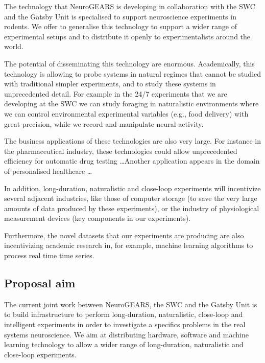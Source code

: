 The technology that NeuroGEARS is developing in collaboration with the SWC and
the Gatsby Unit is specialised to support neuroscience experiments in rodents.
We offer to generalise this technology to support a wider range of experimental
setups and to distribute it openly to experimentalists around the world.

The potential of disseminating this technology are enormous. Academically,
this technology is allowing to probe systems in natural regimes that cannot
be studied with traditional simpler experiments, and to study these systems in
unprecedented detail. For example in the 24/7 experiments that we
are developing at the SWC we can study foraging in naturalistic environments
where we can control environmental experimental variables (e.g., food delivery)
with great precision, while we record and manipulate neural activity.

The business applications of these technologies are also very large. For
instance in the pharmaceutical industry, these technologies could allow
unprecedented efficiency for automatic drug testing \ldots Another application
appears in the domain of personalised healthcare \ldots

In addition, long-duration, naturalistic and close-loop experiments will
incentivize several adjacent industries, like those of computer storage (to
save the very large amounts of data produced by these experiments), or the
industry of physiological measurement devices (key components in our
experiments).

Furthermore, the novel datasets that our experiments are producing are also
incentivizing academic research in, for example, machine learning algorithms to
process real time time series.

\subsection{Proposal aim}

The current joint work between NeuroGEARS, the SWC and the Gatsby Unit is to
build infrastructure to perform long-duration, naturalistic, close-loop and
intelligent experiments in order to investigate a specifics problems in the
real systems neuroscience. We aim at distributing hardware, software and
machine learning technology to allow a wider range of long-duration,
naturalistic and close-loop experiments.
